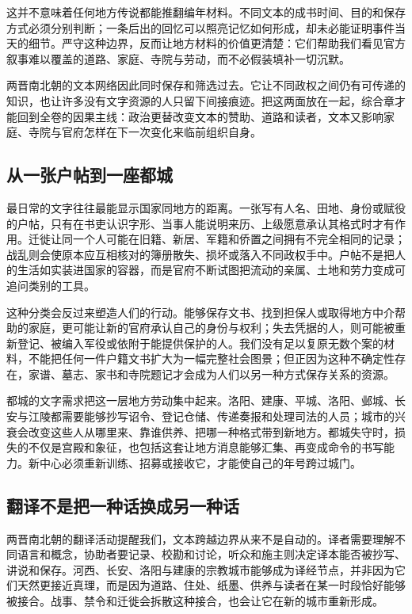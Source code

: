 这并不意味着任何地方传说都能推翻编年材料。不同文本的成书时间、目的和保存方式必须分别判断；一条后出的回忆可以照亮记忆如何形成，却未必能证明事件当天的细节。严守这种边界，反而让地方材料的价值更清楚：它们帮助我们看见官方叙事难以覆盖的道路、家庭、寺院与劳动，而不必假装填补一切沉默。

两晋南北朝的文本网络因此同时保存和筛选过去。它让不同政权之间仍有可传递的知识，也让许多没有文字资源的人只留下间接痕迹。把这两面放在一起，综合章才能回到全卷的因果主线：政治更替改变文本的赞助、道路和读者，文本又影响家庭、寺院与官府怎样在下一次变化来临前组织自身。

\subsection{从一张户帖到一座都城}

最日常的文字往往最能显示国家同地方的距离。一张写有人名、田地、身份或赋役的户帖，只有在书吏认识字形、当事人能说明来历、上级愿意承认其格式时才有作用。迁徙让同一个人可能在旧籍、新居、军籍和侨置之间拥有不完全相同的记录；战乱则会使原本应互相核对的簿册散失、损坏或落入不同政权手中。户帖不是把人的生活如实装进国家的容器，而是官府不断试图把流动的亲属、土地和劳力变成可追问类别的工具。

这种分类会反过来塑造人们的行动。能够保存文书、找到担保人或取得地方中介帮助的家庭，更可能让新的官府承认自己的身份与权利；失去凭据的人，则可能被重新登记、被编入军役或依附于能提供保护的人。我们没有足以复原无数个案的材料，不能把任何一件户籍文书扩大为一幅完整社会图景；但正因为这种不确定性存在，家谱、墓志、家书和寺院题记才会成为人们以另一种方式保存关系的资源。

都城的文字需求把这一层地方劳动集中起来。洛阳、建康、平城、洛阳、邺城、长安与江陵都需要能够抄写诏令、登记仓储、传递奏报和处理司法的人员；城市的兴衰会改变这些人从哪里来、靠谁供养、把哪一种格式带到新地方。都城失守时，损失的不仅是宫殿和象征，也包括这套让地方消息能够汇集、再变成命令的书写能力。新中心必须重新训练、招募或接收它，才能使自己的年号跨过城门。

\subsection{翻译不是把一种话换成另一种话}

两晋南北朝的翻译活动提醒我们，文本跨越边界从来不是自动的。译者需要理解不同语言和概念，协助者要记录、校勘和讨论，听众和施主则决定译本能否被抄写、讲说和保存。河西、长安、洛阳与建康的宗教城市能够成为译经节点，并非因为它们天然更接近真理，而是因为道路、住处、纸墨、供养与读者在某一时段恰好能够被接合。战事、禁令和迁徙会拆散这种接合，也会让它在新的城市重新形成。


